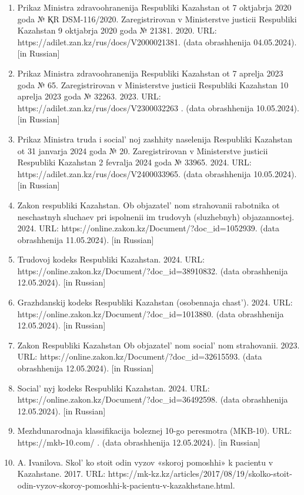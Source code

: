 \begin{references}
\begin{enumerate}
\item
  Prikaz Ministra zdravoohranenija Respubliki Kazahstan ot 7 oktjabrja
  2020 goda № ҚR DSM-116/2020. Zaregistrirovan v Ministerstve justicii
  Respubliki Kazahstan 9 oktjabrja 2020 goda № 21381. 2020. URL:
  https://adilet.zan.kz/rus/docs/V2000021381. (data obrashhenija
  04.05.2024). {[}in Russian{]}
\item
  Prikaz Ministra zdravoohranenija Respubliki Kazahstan ot 7 aprelja
  2023 goda № 65. Zaregistrirovan v Ministerstve justicii Respubliki
  Kazahstan 10 aprelja 2023 goda № 32263. 2023. URL:
  https://adilet.zan.kz/rus/docs/V2300032263 . (data obrashhenija
  10.05.2024). {[}in Russian{]}
\item
  Prikaz Ministra truda i social' noj zashhity naselenija
  Respubliki Kazahstan ot 31 janvarja 2024 goda № 20. Zaregistrirovan v
  Ministerstve justicii Respubliki Kazahstan 2 fevralja 2024 goda №
  33965. 2024. URL: https://adilet.zan.kz/rus/docs/V2400033965. (data
  obrashhenija 10.05.2024). {[}in Russian{]}
\item
  Zakon respubliki Kazahstan. Ob objazatel' nom
  strahovanii rabotnika ot neschastnyh sluchaev pri ispolnenii im
  trudovyh (sluzhebnyh) objazannostej. 2024. URL:
  https://online.zakon.kz/Document/?doc\_id=1052939. (data obrashhenija
  11.05.2024). {[}in Russian{]}
\item
  Trudovoj kodeks Respubliki Kazahstan. 2024. URL:
  https://online.zakon.kz/Document/?doc\_id=38910832. (data obrashhenija
  12.05.2024). {[}in Russian{]}
\item
  Grazhdanskij kodeks Respubliki Kazahstan (osobennaja
  chast'). 2024. URL:
  https://online.zakon.kz/Document/?doc\_id=1013880. (data obrashhenija
  12.05.2024). {[}in Russian{]}
\item
  Zakon Respubliki Kazahstan Ob objazatel' nom
  social' nom strahovanii. 2023. URL:
  https://online.zakon.kz/Document/?doc\_id=32615593. (data obrashhenija
  12.05.2024). {[}in Russian{]}
\item
  Social' nyj kodeks Respubliki Kazahstan. 2024. URL:
  https://online.zakon.kz/Document/?doc\_id=36492598. (data obrashhenija
  12.05.2024). {[}in Russian{]}
\item
  Mezhdunarodnaja klassifikacija boleznej 10-go peresmotra (MKB-10).
  URL: https://mkb-10.com/ . (data obrashhenija 12.05.2024). {[}in
  Russian{]}
\item
  A. Ivanilova. Skol' ko stoit odin vyzov «skoroj
  pomoshhi» k pacientu v Kazahstane. 2017. URL:
  https://mk-kz.kz/articles/2017/08/19/skolko-stoit-odin-vyzov-skoroy-pomoshhi-k-pacientu-v-kazakhstane.html.

\end{enumerate}
\end{references}
